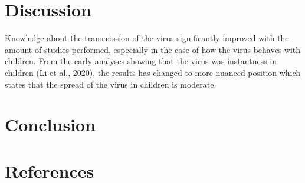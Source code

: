\documentclass[]{elsarticle} %
\begin{document}
\hypertarget{discussion}{%
\section{Discussion}\label{discussion}}

Knowledge about the transmission of the virus significantly improved with the amount of studies performed, especially in the case of how the virus behaves with children. From the early analyses showing that the virus was instantness in children (Li et al., 2020), the results has changed to more nuanced position which states that the spread of the virus in children is moderate.

\hypertarget{conclusion}{%
\section{Conclusion}\label{conclusion}}

\hypertarget{references}{%
\section*{References}\label{references}}
\end{document}

